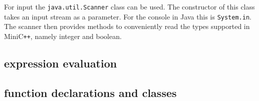 For input the \verb|java.util.Scanner| class can be used. The constructor of this class takes an input stream as a parameter. For the console in Java this is \verb|System.in|. The scanner then provides methods to conveniently read the types supported in MiniC\verb|++|, namely integer and boolean.

\subsection{expression evaluation}

\subsection{function declarations and classes}